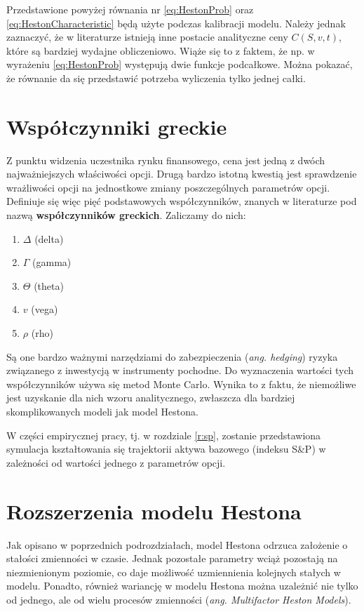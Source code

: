 \documentclass{pracamgr}
\begin{document}
Przedstawione powyżej równania nr \ref{eq:HestonProb} oraz 
\ref{eq:HestonCharacteristic} będą użyte podczas kalibracji modelu. Należy jednak zaznaczyć, że 
w literaturze istnieją inne postacie analityczne ceny $C(S, v, t)$, które są bardziej wydajne obliczeniowo. 
Wiąże się to z faktem, że np. w wyrażeniu \ref{eq:HestonProb} występują dwie funkcje podcałkowe. 
Można pokazać, że równanie da się przedstawić  potrzeba wyliczenia tylko jednej całki.

\section{Współczynniki greckie}

Z punktu widzenia uczestnika rynku finansowego, cena jest jedną z dwóch najważniejszych 
właściwości opcji. Drugą bardzo istotną kwestią jest sprawdzenie wrażliwości opcji na jednostkowe zmiany
poszczególnych parametrów opcji.
Definiuje się więc pięć podstawowych współczynników, znanych w literaturze pod nazwą \textbf{współczynników greckich}.
Zaliczamy do nich:
\begin{enumerate}
  \item $\Delta$ (delta)
  \item $\Gamma$ (gamma)
  \item $\Theta$ (theta)
  \item $v$ (vega)
  \item $\rho$ (rho)
\end{enumerate}
Są one bardzo ważnymi narzędziami do zabezpieczenia (\textit{ang. hedging}) ryzyka 
związanego z inwestycją w instrumenty pochodne.
Do wyznaczenia wartości tych współczynników używa się metod Monte Carlo. Wynika to z faktu, 
że niemożliwe jest uzyskanie dla nich wzoru analitycznego, 
zwłaszcza dla bardziej skomplikowanych modeli jak model Hestona.

W części empirycznej pracy, tj. w rozdziale \ref{r:sp}, zostanie przedstawiona symulacja kształtowania się trajektorii aktywa bazowego (indeksu S\&P) w zależności od wartości jednego z parametrów opcji.

\section{Rozszerzenia modelu Hestona}

Jak opisano w poprzednich podrozdziałach, model Hestona odrzuca założenie o stałości zmienności w czasie. 
Jednak pozostałe parametry wciąż pozostają na niezmienionym poziomie, co daje możliwość uzmiennienia
kolejnych stałych w modelu.
Ponadto, również wariancję w modelu Hestona można uzależnić nie tylko 
od jednego, ale od wielu procesów zmienności (\textit{ang. Multifactor Heston Models}).
\end{document}
